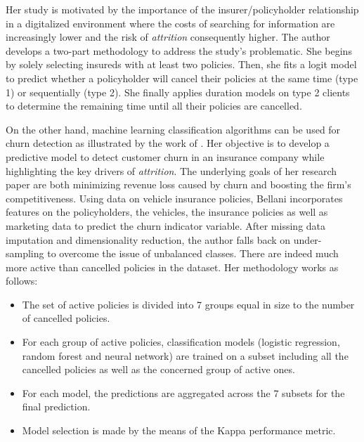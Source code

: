 \documentclass[
]{book}
\providecommand{\tightlist}{%
  \setlength{\itemsep}{0pt}\setlength{\parskip}{0pt}}
\begin{document}
Her study is motivated by the importance of the insurer/policyholder relationship in a digitalized environment where the costs of searching for information are increasingly lower and the risk of \emph{attrition} consequently higher. The author develops a two-part methodology to address the study's problematic. She begins by solely selecting insureds with at least two policies. Then, she fits a logit model to predict whether a policyholder will cancel their policies at the same time (type 1) or sequentially (type 2). She finally applies duration models on type 2 clients to determine the remaining time until all their policies are cancelled.

On the other hand, machine learning classification algorithms can be used for churn detection as illustrated by the work of \citet{CHURN_INSURANCE}. Her objective is to develop a predictive model to detect customer churn in an insurance company while highlighting the key drivers of \emph{attrition}. The underlying goals of her research paper are both minimizing revenue loss caused by churn and boosting the firm's competitiveness. Using data on vehicle insurance policies, Bellani incorporates features on the policyholders, the vehicles, the insurance policies as well as marketing data to predict the churn indicator variable. After missing data imputation and dimensionality reduction, the author falls back on under-sampling to overcome the issue of unbalanced classes. There are indeed much more active than cancelled policies in the dataset. Her methodology works as follows:

\begin{itemize}
\tightlist
\item
  The set of active policies is divided into 7 groups equal in size to the number of cancelled policies.
\item
  For each group of active policies, classification models (logistic regression, random forest and neural network) are trained on a subset including all the cancelled policies as well as the concerned group of active ones.
\item
  For each model, the predictions are aggregated across the 7 subsets for the final prediction.
\item
  Model selection is made by the means of the Kappa performance metric.
\end{itemize}
\end{document}
